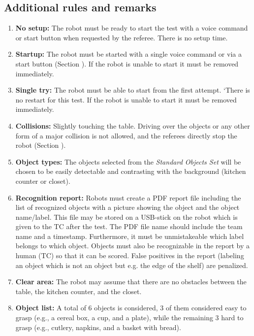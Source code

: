 \subsection{Additional rules and remarks}
\begin{enumerate}
\item \textbf{No setup:} The robot must be ready to start the test with a voice command or start button when requested by the referee. There is no setup time.
\item \textbf{Startup:} The robot must be started with a single voice command or via a start button (Section ). If the robot is unable to start it must be removed immediately.
\item \textbf{Single try:} The robot must be able to start from the first attempt. 
`There is no restart for this test. If the robot is unable to start it must be removed immediately.
\item \textbf{Collisions:} Slightly touching the table.
  Driving over the objects or any other form of a major collision is not allowed, and the referees directly stop the robot (Section ).
\item \textbf{Object types:} The objects selected from the \textit{Standard Objects Set} will be chosen to be easily detectable and contrasting with the background (kitchen counter or closet).
\item \textbf{Recognition report:} Robots must create a PDF report file including the list of recognized objects with a picture showing the object and the object name/label.
  This file may be stored on a USB-stick on the robot which is given to the TC after the test. The PDF file name should include the team name and a timestamp. 
  Furthermore, it must be unmistakeable which label belongs to which object. Objects must also be recognizable in the report by a human (TC) so that it can be scored. 
False positives in the report (labeling an object which is not an object but e.g. the edge of the shelf) are penalized.
  \item \textbf{Clear area:} The robot may assume that there are no obstacles between the table, the kitchen counter, and the closet.
    \item \textbf{Object list:} A total of 6 objects is considered, 3 of them considered easy to grasp (e.g., a cereal box, a cup, and a plate), while the remaining 3 hard to grasp (e.g., cutlery, napkins, and a basket with bread).
\end{enumerate}

